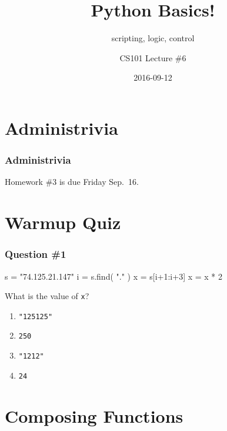 \documentclass[11pt]{beamer}
\title{Python Basics!}
\subtitle{scripting, logic, control}
\author{CS101 Lecture \#6}
\date{2016-09-12}
\begin{document}
  \setcounter{showProgressBar}{0}
  \setcounter{showSlideNumbers}{0}

\frame{\titlepage}

\setcounter{framenumber}{0}
\setcounter{showProgressBar}{1}
\setcounter{showSlideNumbers}{1}

\section{Administrivia}

\begin{frame}
  \frametitle{Administrivia}
  \Enlarge
  \begin{itemize}
  \myitem  Homework \#3 is due Friday Sep.\ 16.
  \end{itemize}
\end{frame}

\section{Warmup Quiz}

\begin{frame}[fragile]
  \frametitle{Question \#1}
  \Enlarge

  \begin{semiverbatim}
s = "74.125.21.147"
i = s.find( "." )
x = s[i+1:i+3]
x = x * 2
  \end{semiverbatim}
  What is the value of \texttt{x}?
  \begin{enumerate}[label=\Alph*]
  \item  \texttt{"125125"}
  \item  \texttt{250}
  \item  \texttt{"1212"}
  \item  \texttt{24}
  \end{enumerate}
\end{frame}

\section{Composing Functions}
\end{document}
